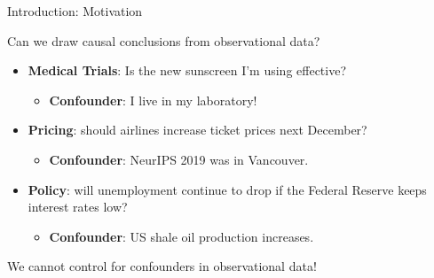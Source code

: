 \documentclass[xcolor={dvipsnames}]{beamer}
\begin{document}
    \begin{frame}{Introduction: Motivation}

        \begin{center}
            \large Can we draw causal conclusions from observational data?
        \end{center}

        \vspace{0.3cm}

        \begin{itemize}
            \item \textbf{Medical Trials}: Is the new sunscreen I'm using effective?
            \begin{itemize}
                \item \textbf{Confounder}: I live in my laboratory!\vspace{0.2cm}
            \end{itemize}
            \item \textbf{Pricing}: should airlines increase ticket prices next December?
            \begin{itemize}
                \item \textbf{Confounder}: NeurIPS 2019 was in Vancouver.\vspace{0.2cm}
            \end{itemize}
            \item \textbf{Policy}: will unemployment continue to drop if the Federal Reserve keeps interest rates low?
            \begin{itemize}
                \item \textbf{Confounder}: US shale oil production increases.
            \end{itemize}
        \end{itemize}

        \vspace{0.3cm}

        \begin{center}
            \large We cannot control for confounders in observational data!
        \end{center}

    \end{frame}
\end{document}

